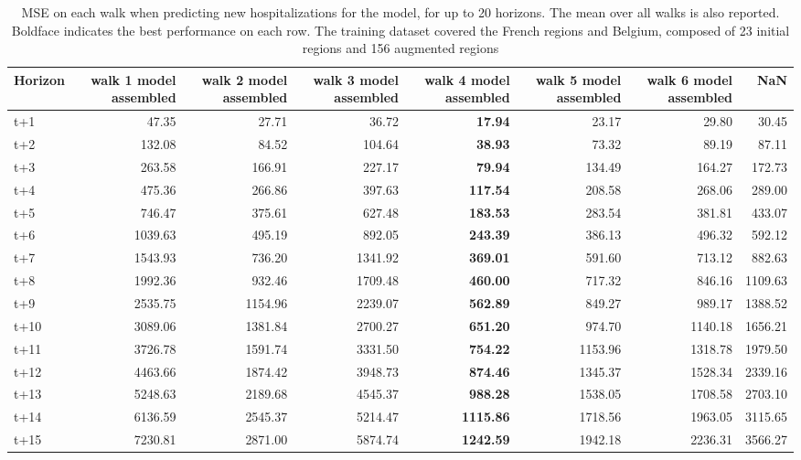 \begin{table}[H]
\centering
\caption{MSE on each walk when predicting new hospitalizations for the model, for up to 20 horizons. The mean over all walks is also reported. Boldface indicates the best performance on each row. The training dataset covered the French regions and Belgium, composed of 23 initial regions and 156 augmented regions }
\label{tab:MSE_walk_assembly}
\begin{tabular}{lrrrrrrr}
\toprule
Horizon &  walk 1 model assembled &  walk 2 model assembled &  walk 3 model assembled &  walk 4 model assembled &  walk 5 model assembled &  walk 6 model assembled &     NaN \\
\midrule
t+1  & 47.35  & 27.71  & 36.72  & \textbf{17.94}  & 23.17  & 29.80  & 30.45  \\
t+2  & 132.08  & 84.52  & 104.64  & \textbf{38.93}  & 73.32  & 89.19  & 87.11  \\
t+3  & 263.58  & 166.91  & 227.17  & \textbf{79.94}  & 134.49  & 164.27  & 172.73  \\
t+4  & 475.36  & 266.86  & 397.63  & \textbf{117.54}  & 208.58  & 268.06  & 289.00  \\
t+5  & 746.47  & 375.61  & 627.48  & \textbf{183.53}  & 283.54  & 381.81  & 433.07  \\
t+6  & 1039.63  & 495.19  & 892.05  & \textbf{243.39}  & 386.13  & 496.32  & 592.12  \\
t+7  & 1543.93  & 736.20  & 1341.92  & \textbf{369.01}  & 591.60  & 713.12  & 882.63  \\
t+8  & 1992.36  & 932.46  & 1709.48  & \textbf{460.00}  & 717.32  & 846.16  & 1109.63  \\
t+9  & 2535.75  & 1154.96  & 2239.07  & \textbf{562.89}  & 849.27  & 989.17  & 1388.52  \\
t+10  & 3089.06  & 1381.84  & 2700.27  & \textbf{651.20}  & 974.70  & 1140.18  & 1656.21  \\
t+11  & 3726.78  & 1591.74  & 3331.50  & \textbf{754.22}  & 1153.96  & 1318.78  & 1979.50  \\
t+12  & 4463.66  & 1874.42  & 3948.73  & \textbf{874.46}  & 1345.37  & 1528.34  & 2339.16  \\
t+13  & 5248.63  & 2189.68  & 4545.37  & \textbf{988.28}  & 1538.05  & 1708.58  & 2703.10  \\
t+14  & 6136.59  & 2545.37  & 5214.47  & \textbf{1115.86}  & 1718.56  & 1963.05  & 3115.65  \\
t+15  & 7230.81  & 2871.00  & 5874.74  & \textbf{1242.59}  & 1942.18  & 2236.31  & 3566.27  \\

\end{tabular}
\end{table}
